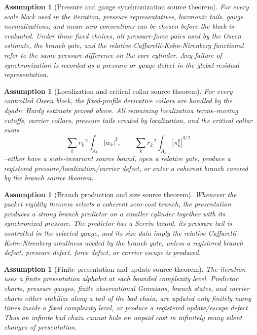 \documentclass[11pt]{article}
\newtheorem{assumption}[theorem]{Assumption}
\begin{document}
\begin{assumption}[Pressure and gauge synchronization source theorem]
For every scale block used in the iteration, pressure representatives, harmonic
tails, gauge normalizations, and mean-zero conventions can be chosen before the
block is evaluated.  Under those fixed choices, all pressure-force pairs used by
the Oseen estimate, the branch gate, and the relative
Caffarelli-Kohn-Nirenberg functional refer to the same pressure difference on
the core cylinder.  Any failure of synchronization is recorded as a pressure or
gauge defect in the global residual representation.
\end{assumption}

\begin{assumption}[Localization and critical collar source theorem]
For every controlled Oseen block, the fixed-profile derivative collars are
handled by the dyadic Hardy estimate proved above.  All remaining localization
terms--moving cutoffs, carrier collars, pressure tails created by localization,
and the critical collar sums
\[
\sum_k r_k^{-2}\int_{A_k}|w_k|^3,
\qquad
\sum_k r_k^{-2}\int_{A_k}|\pi_k^0|^{3/2}
\]
--either have a scale-invariant source bound, open a relative gate, produce a
registered pressure/localization/carrier defect, or enter a coherent branch
covered by the branch source theorem.
\end{assumption}

\begin{assumption}[Branch production and size source theorem]
Whenever the packet rigidity theorem selects a coherent zero-cost branch, the
presentation produces a strong branch predictor on a smaller cylinder together
with its synchronized pressure.  The predictor has a Serrin bound, its pressure
tail is controlled in the selected gauge, and its size data imply the relative
Caffarelli-Kohn-Nirenberg smallness needed by the branch gate, unless a
registered branch defect, pressure defect, force defect, or carrier escape is
produced.
\end{assumption}

\begin{assumption}[Finite presentation and update source theorem]
The iteration uses a finite presentation alphabet at each bounded complexity
level.  Predictor charts, pressure gauges, finite observational Gramians, branch
states, and carrier charts either stabilize along a tail of the bad chain, are
updated only finitely many times inside a fixed complexity level, or produce a
registered update/escape defect.  Thus an infinite bad chain cannot hide an
unpaid cost in infinitely many silent changes of presentation.
\end{assumption}
\end{document}
